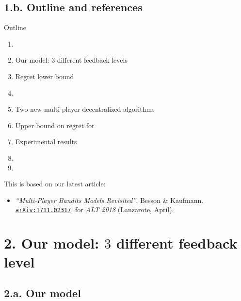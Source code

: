 \documentclass[12pt,english,ignorenonframetext,aspectratio=169,]{beamer}
\providecommand{\tightlist}{%
  \setlength{\itemsep}{0pt}\setlength{\parskip}{0pt}}
\begin{document}
\subsection{\hfill{}1.b. Outline and references\hfill{}}

\begin{frame}{Outline }

\vspace*{-15pt}

\begin{enumerate}
\def\labelenumi{\arabic{enumi}.}
\tightlist
\item
\item
  Our model: \(3\) different feedback levels
\item
  Regret lower bound
\item
\item
  Two new multi-player decentralized algorithms
\item
  Upper bound on regret for \MCTopM
\item
  Experimental results
\item
\item
\end{enumerate}

\pause

\vfill{}

\begin{footnotesize}
This is based on our latest article:
\begin{itemize}
\item \emph{``Multi-Player Bandits Models Revisited''}, Besson \& Kaufmann.
\hspace*{50pt}\texttt{\textcolor{blue}{\href{https://arXiv.org/abs/1711.02317}{arXiv:1711.02317}}}, for \emph{ALT 2018} (Lanzarote, April).
\end{itemize}
\end{footnotesize}

\end{frame}



\section{\hfill{}2. Our model: $3$ different feedback level\hfill{}}

\subsection{\hfill{}2.a. Our model\hfill{}}
\end{document}
